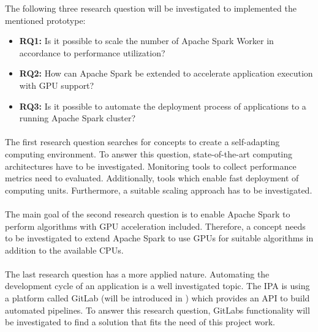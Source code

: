 The following three research question will be investigated to implemented the mentioned prototype:
\begin{itemize}
\item \textbf{RQ1:} Is it possible to scale the number of Apache Spark Worker in accordance to performance utilization?
\item \textbf{RQ2:} How can Apache Spark be extended to accelerate application execution with GPU support?
\item \textbf{RQ3:} Is it possible to automate the deployment process of applications to a running Apache Spark cluster?
\end{itemize}


\paragraph{}
The first research question searches for concepts to create a self-adapting computing environment.
To answer this question, state-of-the-art computing architectures have to be investigated.
Monitoring tools to collect performance metrics need to evaluated. Additionally, tools which enable fast deployment of computing units.
Furthermore, a suitable scaling approach has to be investigated.


\paragraph{}
The main goal of the second research question is to enable Apache Spark to perform algorithms with GPU acceleration included.
Therefore, a concept needs to be investigated to extend Apache Spark to use GPUs for suitable algorithms in addition to the available CPUs.


\paragraph{}
The last research question has a more applied nature.
Automating the development cycle of an application is a well investigated topic.
The IPA is using a platform called GitLab (will be introduced in ) which provides an API to build automated pipelines.
To answer this research question, GitLabs functionality will be investigated to find a solution that fits the need of this project work.


